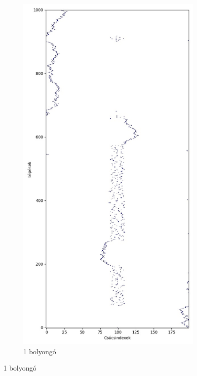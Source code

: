 \begin{figure}[H]
  \centering
  \begin{subfigure}{.45\linewidth}
    \centering
    \includegraphics[width=\linewidth]{./figures/sulyzo/sim00.jpg}
    \caption{1 bolyongó}

\end{subfigure}
\end{figure}
